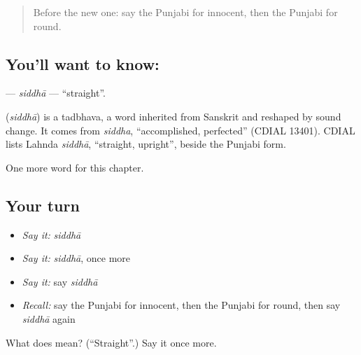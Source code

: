 \label{lesson:PA-C141-siddha}



\begin{quote}
Before the new one: say the Punjabi for innocent, then the Punjabi for round.
\end{quote}

\subsection*{You'll want to know: }
\textbf{} — \emph{siddhā} — \textquotedblleft{}straight\textquotedblright{}.

\begin{cousinweb}
\textbf{} (\emph{siddhā}) is a tadbhava, a word inherited from Sanskrit and reshaped by sound change. It comes from \emph{siddha}, \textquotedblleft{}accomplished, perfected\textquotedblright{} (CDIAL 13401). CDIAL lists Lahnda \emph{siddhā}, \textquotedblleft{}straight, upright\textquotedblright{}, beside the Punjabi form.
\end{cousinweb}

\begin{grammarlens}[title={What you've built}]
One more word for this chapter.
\end{grammarlens}

\subsection*{Your turn}
\begin{itemize}
\raggedright
  \item \emph{Say it:} \emph{siddhā}
  \item \emph{Say it:} \emph{siddhā}, once more
  \item \emph{Say it:} say \emph{siddhā}
  \item \emph{Recall:} say the Punjabi for innocent, then the Punjabi for round, then say \emph{siddhā} again
\end{itemize}

\begin{tcolorbox}[breakable,colback=teal!4,colframe=teal!35!black,title={Before you move on}]
What does  mean? (\textquotedblleft{}Straight\textquotedblright{}.) Say it once more.
\end{tcolorbox}
